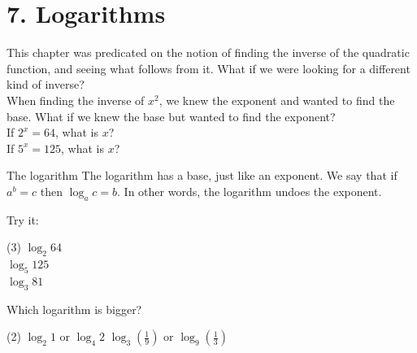 \documentclass[12pt,fleqn]{book}
\begin{document}
\chapter{7. Logarithms}
This chapter was predicated on the notion of finding the inverse of the quadratic function, and seeing what follows from it.  What if we were looking for a different kind of inverse?
\\[1em]
When finding the inverse of $x^2$, we knew the exponent and wanted to find the base.  What if we knew the base but wanted to find the exponent?
\\[1em]
If $2^x=64$, what is $x$?
\\[1in]
If $5^x=125$, what is $x$?
\\[1in]
\begin{defn}{The logarithm}{}
    The logarithm has a base, just like an exponent.  We say that if $a^b=c$ then $\log_a c=b$.  In other words, the logarithm undoes the exponent.
\end{defn}
Try it:
\begin{tasks}(3)
    \task
    $\log_2 64$
    \\[1in]
    \task
    $\log_5 125$
    \\[1in]
    \task
    $\log_3 81$
    \\[1in]
\end{tasks}
Which logarithm is bigger?
\begin{tasks}(2)
    \task
    $\log _2 1$ or $\log _4 2$
    \task
    $\log _3\left(\frac{1}{9}\right)$ or $\log _9\left(\frac{1}{3}\right)$
\end{tasks}
\clearpage
\end{document}
